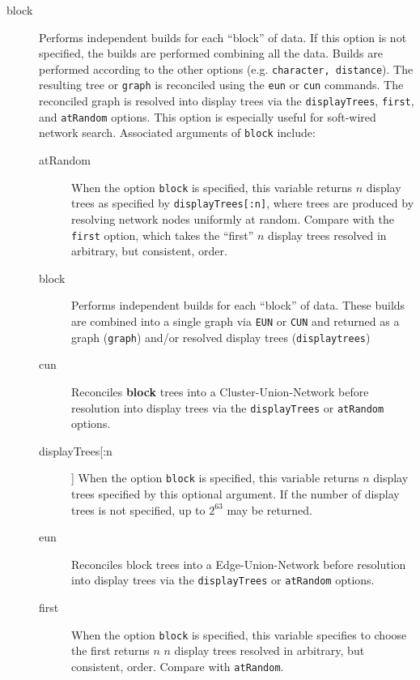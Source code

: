 	\begin{description}

		\item[block] Performs independent builds for each ``block'' of data. If this option 
		is not specified, the builds are performed combining all the data. Builds are performed 
		according 	to the other options (e.g. \texttt{character, distance}). The resulting tree 
		or \texttt{graph} is reconciled using the \texttt{eun} or \texttt{cun} commands. The 
		reconciled graph is resolved into display trees via the \texttt{displayTrees}, \texttt{first}, 
		and \texttt{atRandom} options. This option is especially useful for soft-wired network search. 
		Associated arguments of \texttt{block} include:
				
		\begin{description}
			\item[atRandom] When the option \texttt{block} is specified, this variable returns $n$ 
			display trees as specified by \texttt{displayTrees[:n]}, where trees are produced by 
			resolving network nodes uniformly at random. Compare with the \texttt{first} option, 
			which takes the ``first'' $n$ display trees resolved in arbitrary, but consistent, order.

			\item[block] Performs independent builds for each ``block'' of data.  These builds are combined
			into a single graph via \texttt{EUN} or \texttt{CUN} and returned as a graph (\texttt{graph}) and/or
			resolved display trees (\texttt{displaytrees})
			
			\item[cun] Reconciles \textbf {block} trees into a Cluster-Union-Network \citep{Baroni2005} 
			before resolution into display trees via the \texttt{displayTrees} or \texttt{atRandom} 
			options.
	
			\item[displayTrees[:n]] When the option \texttt{block} is specified, this variable 
			returns $n$ display trees specified by this optional argument. If the number of 
			display trees is not specified, up to $2^{63}$ may be returned.

			\item[eun] Reconciles block trees into a Edge-Union-Network \citep{MiyagiandWheeler2019, 
			Wheeler2022} before resolution into display trees via the \texttt{displayTrees} or 
			\texttt{atRandom} 
			options.

			\item[first] When the option \texttt{block} is specified, this variable specifies to 
			choose the first returns $n$ $n$ display trees resolved in arbitrary, but consistent, 
			order. Compare with 	\texttt{atRandom}.
			

\end{description}
\end{description}
